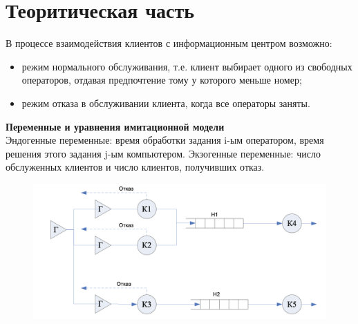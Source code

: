 \documentclass[a4paper, 12pt]{article}
\begin{document}
\section{{Теоритическая часть}}
\hspace*{5mm} В процессе взаимодействия клиентов с информационным центром возможно:
\begin{itemize}
	\item режим нормального обслуживания, т.е. клиент выбирает одного из свободных операторов, отдавая предпочтение тому у которого меньше номер;
	\item режим отказа в обслуживании клиента, когда все операторы заняты. 
\end{itemize}
\textbf{Переменные и уравнения имитационной модели }
\\ \hspace*{5mm} Эндогенные переменные: время обработки задания i-ым оператором, время решения этого задания j-ым компьютером.
\clearpage
\newpage
\hspace*{5mm}  Экзогенные переменные: число обслуженных клиентов и число клиентов, получивших отказ.
\begin{figure}[h!]
	\centering \includegraphics[scale=0.7]{schema1}
\end{figure}
\end{document}
